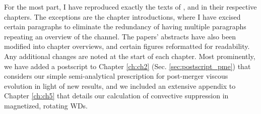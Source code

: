 For the most part, I have reproduced exactly the texts of \citeal{zhu+13}, \citeal{zhu+15} and \citeal{zhu+16} in their respective chapters.  The exceptions are the chapter introductions, where I have excised certain paragraphs to eliminate the redundancy of having multiple paragraphs repeating an overview of the \citeal{vkercj10} channel.  The papers' abstracts have also been modified into chapter overviews, and certain figures reformatted for readability.  Any additional changes are noted at the start of each chapter.  Most prominently, we have added a postscript to Chapter \ref{ch:ch2} (Sec. \ref{sec:postscript_pme}) that considers our simple semi-analytical prescription for post-merger viscous evolution in light of new results, and we included an extensive appendix to Chapter \ref{ch:ch5} that details our calculation of convective suppression in magnetized, rotating WDs.

